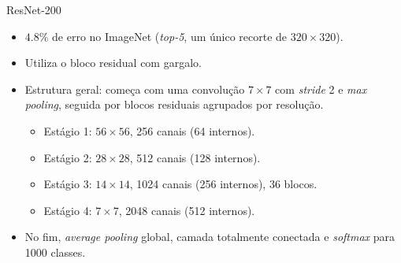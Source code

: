 \documentclass[aspectratio=169,xcolor=dvipsnames]{beamer}
\begin{document}
\begin{frame}{ResNet-200}
\begin{itemize}
    \item $4.8\%$ de erro no ImageNet (\textit{top-5}, um único recorte de $320\times 320$).
    \item Utiliza o bloco residual com gargalo.
    \item Estrutura geral: começa com uma convolução $7\times 7$ com \textit{stride} 2 e \textit{max pooling}, seguida por blocos residuais agrupados por resolução.
    \begin{itemize}
        \item Estágio 1: $56\times 56$, 256 canais (64 internos).
        \item Estágio 2: $28\times 28$, 512 canais (128 internos).
        \item Estágio 3: $14\times 14$, 1024 canais (256 internos), 36 blocos.
        \item Estágio 4: $7\times 7$, 2048 canais (512 internos).
    \end{itemize}
    \item No fim, \textit{average pooling} global, camada totalmente conectada e \textit{softmax} para 1000 classes.
\end{itemize}
\end{frame}
\end{document}
